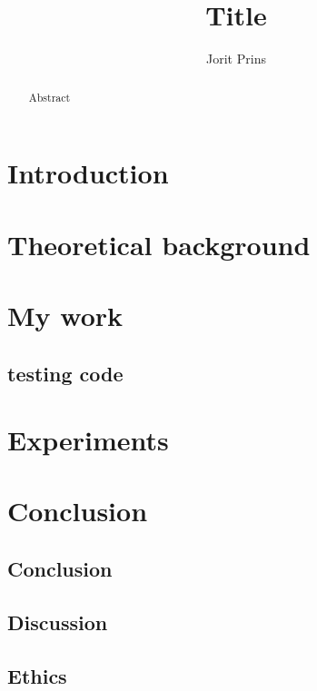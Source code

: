 \documentclass[twoside]{Style/uva-inf-bachelor-thesis}
\title{Title}
\author{Jorit Prins}
\begin{document}
\maketitle

\begin{abstract}
Abstract
\end{abstract}

\tableofcontents

\chapter{Introduction}


\chapter{Theoretical background}


\chapter{My work}
\section{testing code}

\chapter{Experiments}




\chapter{Conclusion}
\section{Conclusion}
\section{Discussion}
\section{Ethics}
\end{document}
